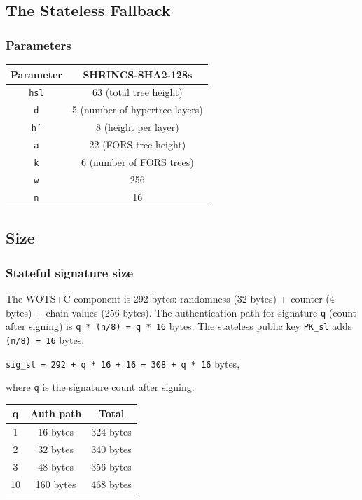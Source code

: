 \subsection{The Stateless Fallback}
\subsubsection{Parameters}

\begin{center}
\begin{tabular}{ c c }
 Parameter & SHRINCS-SHA2-128s \\ 
 \hline
 \texttt{hsl} & 63 (total tree height)\\
 \texttt{d} & 5 (number of hypertree layers) \\
 \texttt{h'} & 8 (height per layer) \\
 \texttt{a} & 22 (FORS tree height) \\
 \texttt{k} & 6 (number of FORS trees) \\
 \texttt{w} & 256 \\
 \texttt{n} & 16 \\
\end{tabular}
\end{center}


\subsection{Size}
\subsubsection{Stateful signature size}

The WOTS+C component is 292 bytes: randomness (32 bytes) + counter (4 bytes) + chain values (256 bytes).
The authentication path for signature \texttt{q} (count after signing) is \texttt{q * (n/8) = q * 16} 
bytes. The stateless public key \texttt{PK\_sl} adds \texttt{(n/8) = 16} bytes.
\begin{center}
    \texttt{sig\_sl = 292 + q * 16 + 16 = 308 + q * 16} bytes,
\end{center}
where \texttt{q} is the signature count after signing:
\begin{center}
\begin{tabular}{ c c c}
    q & Auth path & Total \\
    \hline
    1 & 16 bytes & 324 bytes \\
    2 & 32 bytes & 340 bytes \\
    3 & 48 bytes & 356 bytes \\
    10 & 160 bytes & 468 bytes
\end{tabular}
\end{center}

